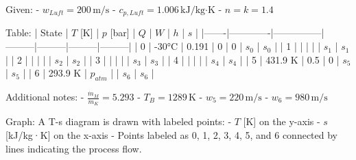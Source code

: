 Given:  
- \( w_{Luft} = 200 \, \text{m/s} \)  
- \( c_{p,Luft} = 1.006 \, \text{kJ/kg·K} \)  
- \( n = k = 1.4 \)  

Table:  
| State | \( T \) [K] | \( p \) [bar] | \( Q \) | \( W \) | \( h \) | \( s \) |  
|-------|-------------|---------------|---------|---------|---------|---------|  
| 0     | -30°C       | 0.191         | 0       | 0       | \( s_0 \) | \( s_0 \) |  
| 1     |             |               |         |         | \( s_1 \) | \( s_1 \) |  
| 2     |             |               |         |         | \( s_2 \) | \( s_2 \) |  
| 3     |             |               |         |         | \( s_3 \) | \( s_3 \) |  
| 4     |             |               |         |         | \( s_4 \) | \( s_4 \) |  
| 5     | 431.9 K     | 0.5           | 0       | \( s_5 \) | \( s_5 \) |  
| 6     | 293.9 K     | \( p_{atm} \) |         | \( s_6 \) | \( s_6 \) |  

Additional notes:  
- \( \frac{\dot{m}_M}{\dot{m}_K} = 5.293 \)  
- \( T_B = 1289 \, \text{K} \)  
- \( w_5 = 220 \, \text{m/s} \)  
- \( w_6 = 980 \, \text{m/s} \)  

Graph:  
A T-s diagram is drawn with labeled points:  
- \( T \) [K] on the y-axis  
- \( s \) [kJ/kg·K] on the x-axis  
- Points labeled as 0, 1, 2, 3, 4, 5, and 6 connected by lines indicating the process flow.